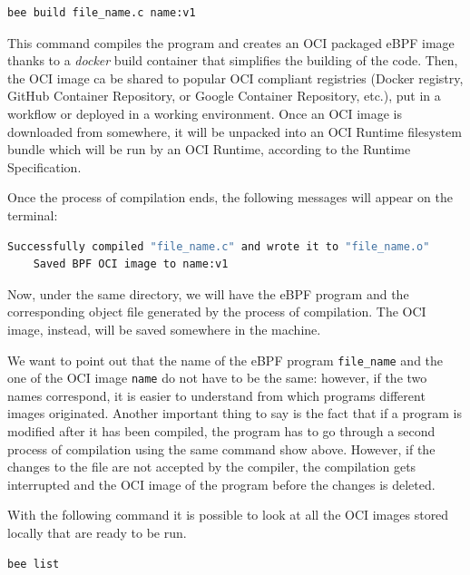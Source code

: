 \begin{lstlisting}[style=commandline, language=bash, caption={bee built command}]
	bee build file_name.c name:v1
\end{lstlisting}

This command compiles the program and creates an OCI packaged eBPF image thanks to a \textit{docker} build container that simplifies the building of the code.
Then, the OCI image ca be shared to popular OCI compliant registries (Docker registry, GitHub Container Repository, or Google Container Repository, etc.), put in a workflow or deployed in a working environment.
Once an OCI image is downloaded from somewhere, it will be unpacked into an OCI Runtime filesystem bundle which will be run by an OCI Runtime, according to the Runtime Specification.

Once the process of compilation ends, the following messages will appear on the terminal: 

\begin{lstlisting}[style=commandline, language=bash, caption={bee successful OCI creation messages}]
	Successfully compiled "file_name.c" and wrote it to "file_name.o"
	Saved BPF OCI image to name:v1
\end{lstlisting}

Now, under the same directory, we will have the eBPF program and the corresponding object file generated by the process of compilation.
The OCI image, instead, will be saved somewhere in the machine.

We want to point out that the name of the eBPF program \colorbox{backcolour}{\lstinline[style=highlight, language=bash]|file_name|} and the one of the OCI image \colorbox{backcolour}{\lstinline[style=highlight, language=bash]|name|} do not have to be the same: however, if the two names correspond, it is easier to understand from which programs different images originated.
Another important thing to say is the fact that if a program is modified after it has been compiled, the program has to go through a second process of compilation using the same command show above.
However, if the changes to the file are not accepted by the compiler, the compilation gets interrupted and the OCI image of the program before the changes is deleted.

With the following command it is possible to look at all the OCI images stored locally that are ready to be run.

\begin{lstlisting}[style=commandline, language=bash, caption={bee list command}]
	bee list
\end{lstlisting}

